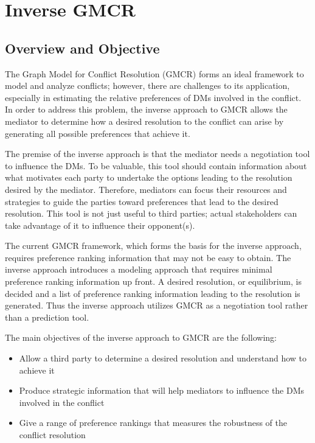 \documentclass[letterpaper,12pt,titlepage,oneside,final]{book}
\begin{document}

\chapter{Inverse GMCR}
\section{Overview and Objective}

The Graph Model for Conflict Resolution (GMCR) forms an ideal framework to model and analyze conflicts; however, there are challenges to its application, especially in estimating the relative preferences of DMs involved in the conflict. In order to address this problem, the inverse approach to GMCR allows the mediator to determine how a desired resolution to the conflict can arise by generating all possible preferences that achieve it.

The premise of the inverse approach is that the mediator needs a negotiation tool to influence the DMs. To be valuable, this tool should contain information about what motivates each party to undertake the options leading to the resolution desired by the mediator. Therefore, mediators can focus their resources and strategies to guide the parties toward preferences that lead to the desired resolution. This tool is not just useful to third parties; actual stakeholders can take advantage of it to influence their opponent(s).

The current GMCR framework, which forms the basis for the inverse approach, requires preference ranking information that may not be easy to obtain. The inverse approach introduces a modeling approach that requires minimal preference ranking information up front. A desired resolution, or equilibrium, is decided and a list of preference ranking information leading to the resolution is generated. Thus the inverse approach utilizes GMCR as a negotiation tool rather than a prediction tool.

The main objectives of the inverse approach to GMCR are the following:
\begin{itemize}
\item Allow a third party to determine a desired resolution and understand how to achieve it
\item Produce strategic information that will help mediators to influence the DMs involved in the conflict
\item Give a range of preference rankings that measures the robustness of the conflict resolution
\end{itemize}
\end{document}

